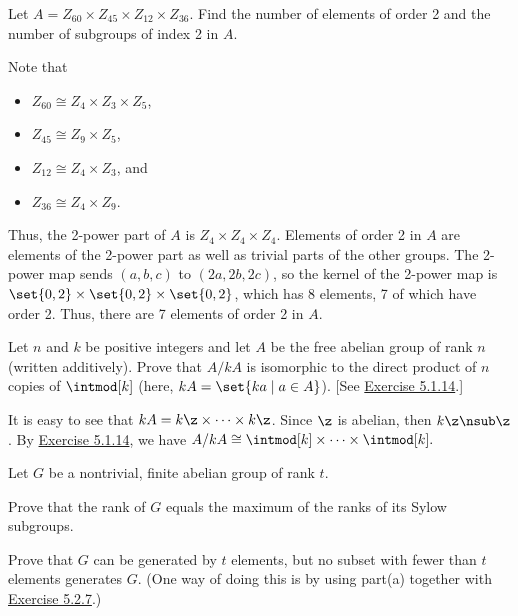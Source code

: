\begin{exercise}\label{ex5.2.9}
    Let $A = Z_{60} \times Z_{45} \times Z_{12} \times Z_{36}$. Find the number of elements of order 2 and the number of subgroups of index 2 in $A$.
\end{exercise}

\begin{sol}
    Note that
    \begin{itemize}
        \item $Z_{60} \cong Z_4 \times Z_3 \times Z_5$,
        \item $Z_{45} \cong Z_9 \times Z_5$,
        \item $Z_{12} \cong Z_4 \times Z_3$, and
        \item $Z_{36} \cong Z_4 \times Z_9$.
    \end{itemize}
    Thus, the 2-power part of $A$ is $Z_4 \times Z_4 \times Z_4$. Elements of order 2 in $A$ are elements of the 2-power part as well as trivial parts of the other groups. The 2-power map sends $(a, b, c)$ to $(2a, 2b, 2c)$, so the kernel of the 2-power map is $\set{0, 2} \times \set{0, 2} \times \set{0, 2}$, which has 8 elements, 7 of which have order 2. Thus, there are 7 elements of order 2 in $A$.
\end{sol}

\begin{exercise}\label{ex5.2.10}
    Let $n$ and $k$ be positive integers and let $A$ be the free abelian group of rank $n$ (written additively). Prove that $A/kA$ is isomorphic to the direct product of $n$ copies of $\intmod[k]$ (here, $kA = \set{ka \mid a \in A}$). [See \hyperref[ex5.1.14]{Exercise 5.1.14}.]
\end{exercise}

\begin{sol}
    It is easy to see that $kA = k\z \times \cdots \times k\z$. Since $\z$ is abelian, then $k\z \nsub \z$. By \hyperref[ex5.1.14]{Exercise 5.1.14}, we have $A/kA \cong \intmod[k] \times \cdots \times \intmod[k].$
\end{sol}

\newpage

\begin{exercise}\label{ex5.2.11}
    Let $G$ be a nontrivial, finite abelian group of rank $t$.
    \begin{subproblems}
        \item Prove that the rank of $G$ equals the maximum of the ranks of its Sylow subgroups.
        \item Prove that $G$ can be generated by $t$ elements, but no subset with fewer than $t$ elements generates $G$. (One way of doing this is by using part(a) together with \hyperref[ex5.2.7]{Exercise 5.2.7}.)
    \end{subproblems}
\end{exercise}

